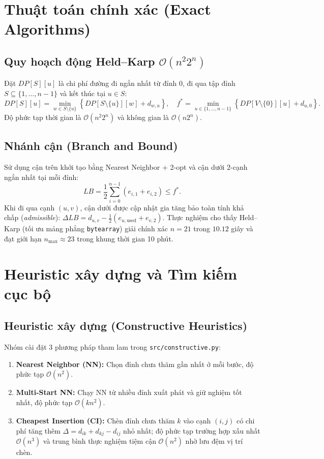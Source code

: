 \documentclass[12pt,a4paper]{report}
\begin{document}
\chapter{Thuật toán chính xác (Exact Algorithms)}

\section{Quy hoạch động Held--Karp $\mathcal{O}(n^2 2^n)$}
Đặt $DP[S][u]$ là chi phí đường đi ngắn nhất từ đỉnh $0$, đi qua tập đỉnh $S \subseteq \{1,\dots,n-1\}$ và kết thúc tại $u \in S$:
\begin{equation}
    DP[S][u] = \min_{w \in S \setminus \{u\}} \left\{ DP[S \setminus \{u\}][w] + d_{w,u} \right\}, \quad f^* = \min_{u \in \{1,\dots,n-1\}} \left\{ DP[V\setminus\{0\}][u] + d_{u,0} \right\}.
\end{equation}
Độ phức tạp thời gian là $\mathcal{O}(n^2 2^n)$ và không gian là $\mathcal{O}(n 2^n)$.

\section{Nhánh cận (Branch and Bound)}
Sử dụng cận trên khởi tạo bằng Nearest Neighbor + 2-opt và cận dưới 2-cạnh ngắn nhất tại mỗi đỉnh:
\begin{equation}
    LB = \frac{1}{2} \sum_{i=0}^{n-1} (e_{i,1} + e_{i,2}) \le f^*.
\end{equation}
Khi đi qua cạnh $(u, v)$, cận dưới được cập nhật gia tăng bảo toàn tính khả chấp (\textit{admissible}): $\Delta LB = d_{u,v} - \frac{1}{2}(e_{u,\text{used}} + e_{v,2})$. Thực nghiệm cho thấy Held--Karp (tối ưu mảng phẳng \texttt{bytearray}) giải chính xác $n=21$ trong $10.12$ giây và đạt giới hạn $n_{\max} \approx 23$ trong khung thời gian 10 phút.

\chapter{Heuristic xây dựng và Tìm kiếm cục bộ}

\section{Heuristic xây dựng (Constructive Heuristics)}
Nhóm cài đặt 3 phương pháp tham lam trong \texttt{src/constructive.py}:
\begin{enumerate}
    \item \textbf{Nearest Neighbor (NN):} Chọn đỉnh chưa thăm gần nhất ở mỗi bước, độ phức tạp $\mathcal{O}(n^2)$.
    \item \textbf{Multi-Start NN:} Chạy NN từ nhiều đỉnh xuất phát và giữ nghiệm tốt nhất, độ phức tạp $\mathcal{O}(k n^2)$.
    \item \textbf{Cheapest Insertion (CI):} Chèn đỉnh chưa thăm $k$ vào cạnh $(i,j)$ có chi phí tăng thêm $\Delta = d_{ik} + d_{kj} - d_{ij}$ nhỏ nhất; độ phức tạp trường hợp xấu nhất $\mathcal{O}(n^3)$ và trung bình thực nghiệm tiệm cận $\mathcal{O}(n^2)$ nhờ lưu đệm vị trí chèn.
\end{enumerate}
\end{document}
